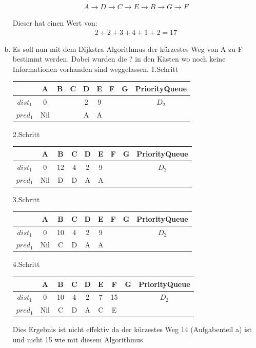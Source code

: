 \documentclass[11pt]{article}
\begin{document}
\begin{enumerate}[a)]
	
	\begin{align*}
		A \rightarrow D \rightarrow C \rightarrow E \rightarrow B \rightarrow G \rightarrow F
	\end{align*}
	
	
	Dieser hat einen Wert von:
	\begin{align*}
		2 + 2 + 3 + 4 + 1 + 2 = 17
	\end{align*} 
	\newpage
	\item
	Es soll nun mit dem Dijkstra Algorithmus der kürzestes Weg von A zu F bestimmt
	werden. Dabei wurden die ? in den Kästen wo noch keine Informationen vorhanden
	sind weggelassen.
	1.Schritt
	
	\begin{tabular}{|c|c|c|c|c|c|c|c|c|}
		\hline  		  & A & B & C & D & E & F & G & PriorityQueue\\ 
		\hline $dist_{1}$ & 0 &   &  & 2 & 9 &	&  & $D_{2}$\\ 
		\hline $pred_{1}$ & Nil &  &  & A & A &	&  &\\
		\hline 
	\end{tabular} 
	
	2.Schritt
	
	\begin{tabular}{|c|c|c|c|c|c|c|c|c|}
		\hline  		  & A & B & C & D & E & F & G & PriorityQueue\\ 
		\hline $dist_{1}$ & 0 & 12  & 4 & 2 & 9 &  &  & $D_{2}$\\ 
		\hline $pred_{1}$ & Nil & D & D & A & A &  &  &\\
		\hline 
	\end{tabular} 
	
	3.Schritt
	
	\begin{tabular}{|c|c|c|c|c|c|c|c|c|}
		\hline  		  & A & B & C & D & E & F & G & PriorityQueue\\ 
		\hline $dist_{1}$ & 0 & 10  & 4 & 2 & 9 &  &  & $D_{2}$\\ 
		\hline $pred_{1}$ & Nil & C & D & A & A &  &  &\\
		\hline 
	\end{tabular}  
	
	4.Schritt
	
	\begin{tabular}{|c|c|c|c|c|c|c|c|c|}
		\hline  		  & A & B & C & D & E & F & G & PriorityQueue\\ 
		\hline $dist_{1}$ & 0 & 10  & 4 & 2 & 7 & 15 &  & $D_{2}$\\ 
		\hline $pred_{1}$ & Nil & C & D & A & C & E &  &\\
		\hline 
	\end{tabular}
	
	Dies Ergebnis ist nicht effektiv da der kürzestes Weg 14 (Aufgabenteil a) ist und nicht 15 wie mit diesem Algorithmus
	
	
\end{enumerate}   
  
\end{document}
